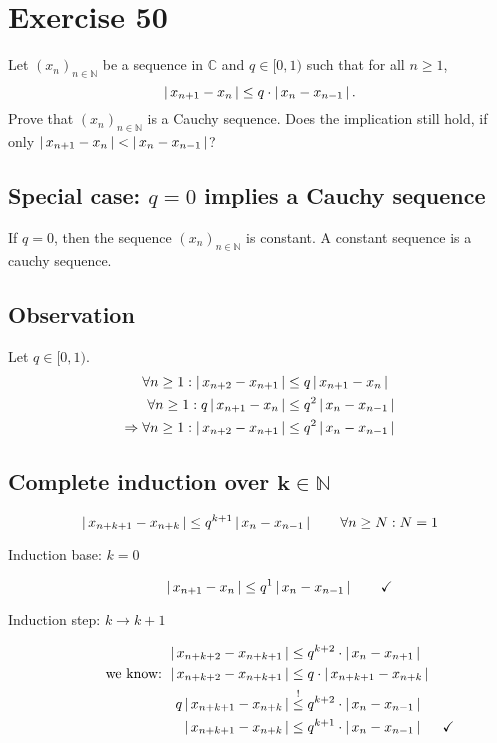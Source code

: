 \documentclass[a4paper]{article}
\theoremstyle{definition}
\newcommand\abs[1]{\left|\thinspace #1\thinspace\right|}
\newcommand\seq[1]{\left(#1\right)_{n\in\mathbb N}}
\begin{document}
\section{Exercise 50}
\begin{ex}
  Let $\seq{x_n}$ be a sequence in $\mathbb C$ and $q \in [0, 1)$ such that for all $n \geq 1$,
  \[ \abs{x_{n+1} - x_n} \leq q \cdot \abs{x_n - x_{n-1}}. \]
  Prove that $\seq{x_n}$ is a Cauchy sequence. Does the implication still hold, if only
  $\abs{x_{n+1} - x_n} < \abs{x_n - x_{n-1}}$?
\end{ex}

\subsection{Special case: $q=0$ implies a Cauchy sequence}
%
If $q = 0$, then the sequence $\seq{x_n}$ is constant. A constant sequence is a cauchy sequence.

\subsection{Observation}
%
Let $q \in [0, 1)$.
\begin{align*}
  \forall n \geq 1: \abs{x_{n+2} - x_{n+1}} &\leq q \abs{x_{n+1} - x_n} \\
  \forall n \geq 1: q \abs{x_{n+1} - x_n} &\leq q^2 \abs{x_n - x_{n-1}} \\
  \Rightarrow \forall n \geq 1: \abs{x_{n+2} - x_{n+1}} &\leq q^2 \abs{x_n - x_{n-1}}
\end{align*}

\subsection{Complete induction over $\mathbf{k \in \mathbb N}$}
%
\[ \abs{x_{n+k+1} - x_{n+k}} \leq q^{k+1} \abs{x_n - x_{n-1}} \qquad \forall n \geq N: N = 1 \]
\begin{description}
  \item[Induction base: $k = 0$]
    \[ \abs{x_{n+1} - x_n} \leq q^1 \abs{x_n - x_{n-1}} \qquad \checkmark \]
  \item[Induction step: $k \rightarrow k + 1$]
    \begin{align*}
      \abs{x_{n+k+2} - x_{n+k+1}} &\leq q^{k+2} \cdot \abs{x_n - x_{n+1}} \\
      \text{we know: } \abs{x_{n+k+2} - x_{n+k+1}} &\leq q \cdot \abs{x_{n+k+1} - x_{n+k}} \\
      q \abs{x_{n+k+1} - x_{n+k}} &\stackrel{!}{\leq} q^{k+2} \cdot \abs{x_n - x_{n-1}} \\
      \abs{x_{n+k+1} - x_{n+k}} &\leq q^{k+1} \cdot \abs{x_n - x_{n-1}} &\checkmark
    \end{align*}
\end{description}
\end{document}
